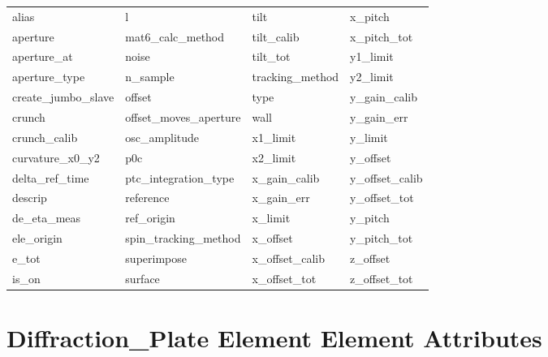  \begin{tabular}{llll} \toprule
alias                       & l                           & tilt                        & x_pitch                     \\
aperture                    & mat6_calc_method            & tilt_calib                  & x_pitch_tot                 \\
aperture_at                 & noise                       & tilt_tot                    & y1_limit                    \\
aperture_type               & n_sample                    & tracking_method             & y2_limit                    \\
create_jumbo_slave          & offset                      & type                        & y_gain_calib                \\
crunch                      & offset_moves_aperture       & wall                        & y_gain_err                  \\
crunch_calib                & osc_amplitude               & x1_limit                    & y_limit                     \\
curvature_x0_y2             & p0c                         & x2_limit                    & y_offset                    \\
delta_ref_time              & ptc_integration_type        & x_gain_calib                & y_offset_calib              \\
descrip                     & reference                   & x_gain_err                  & y_offset_tot                \\
de_eta_meas                 & ref_origin                  & x_limit                     & y_pitch                     \\
ele_origin                  & spin_tracking_method        & x_offset                    & y_pitch_tot                 \\
e_tot                       & superimpose                 & x_offset_calib              & z_offset                    \\
is_on                       & surface                     & x_offset_tot                & z_offset_tot                \\
 \bottomrule
 \end{tabular}
 \vfill
 
 \section{Diffraction_Plate Element Element Attributes}
 \label{s:list.diffraction.plate}
 
